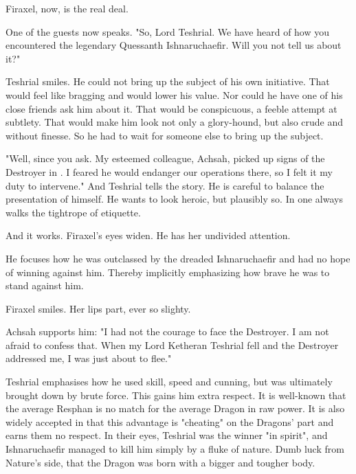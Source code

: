 Firaxel, now, is the real deal. 

One of the guests now speaks. 
"So, Lord Teshrial. 
 We have heard of how you encountered the legendary Quessanth Ishnaruchaefir.
 Will you not tell us about it?"

Teshrial smiles. 
He could not bring up the subject of his own initiative. 
That would feel like bragging and would lower his value. 
Nor could he have one of his close friends ask him about it. 
That would be conspicuous, a feeble attempt at subtlety.
That would make him look not only a glory-hound, but also crude and without finesse. 
So he had to wait for someone else to bring up the subject. 

"Well, since you ask.
 My esteemed colleague, Achsah, picked up signs of the Destroyer in \Malcur. 
 I feared he would endanger our operations there, so I felt it my duty to intervene."
And Teshrial tells the story. 
He is careful to balance the presentation of himself. 
He wants to look heroic, but plausibly so. 
In \CiriathSepher one always walks the tightrope of etiquette.

And it works. 
Firaxel's eyes widen. 
He has her undivided attention. 

He focuses how he was outclassed by the dreaded Ishnaruchaefir and had no hope of winning against him. 
Thereby implicitly emphasizing how brave he was to stand against him. 

Firaxel smiles. 
Her lips part, ever so slighty.

Achsah supports him:
"I had not the courage to face the Destroyer.
 I am not afraid to confess that.
 When my Lord Ketheran Teshrial fell and the Destroyer addressed me, I was just about to flee."

Teshrial emphasises how he used skill, speed and cunning, but was ultimately brought down by brute force. 
This gains him extra respect. 
It is well-known that the average Resphan is no match for the average Dragon in raw power. 
It is also widely accepted in \CiriathSepher that this advantage is "cheating" on the Dragons' part and earns them no respect. 
In their eyes, Teshrial was the winner "in spirit", and Ishnaruchaefir managed to kill him simply by a fluke of nature. 
Dumb luck from Nature's side, that the Dragon was born with a bigger and tougher body. 

